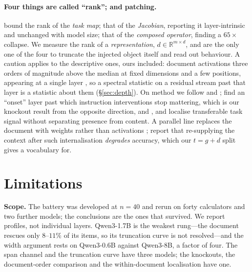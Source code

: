 \documentclass{article}
\newcommand{\dvec}{\ensuremath{d}}
\newcommand{\gvec}{\ensuremath{g}}
\newcommand{\tvec}{\ensuremath{t}}
\begin{document}
\paragraph{Four things are called ``rank''; and patching.}
\citet{dong2026taskvectorlimits} bound the rank of the \emph{task map};
\citet{sarkar2026causaldim} that of the \emph{Jacobian}, reporting it
layer-intrinsic and unchanged with model size;
\citet{fernando2026residualspectral} that of the \emph{composed operator},
finding a $65\times$ collapse. We measure the rank of a \emph{representation},
$\dvec\in\mathbb{R}^{m\times d}$, and are the only one of the four to truncate
the injected object itself and read out behaviour. A caution applies to the
descriptive ones, ours included: \citet{sun2024massive} document activations
three orders of magnitude above the median at fixed dimensions and a few
positions, appearing at a single layer \citep{shi2026melayer}, so a spectral
statistic on a residual stream past that layer is a statistic about them
(\S\ref{sec:depth}). On method we follow \citet{zhang2023bestpractices} and
\citet{heimersheim2024patching}; \citet{onset2025instruction} find an ``onset''
layer past which instruction interventions stop mattering, which is our knockout
result from the opposite direction, and \citet{jit2025taskrepr},
\citet{semanticconflicts2026} and \citet{ragcite2026} localise transferable task
signal without separating presence from content. A parallel line replaces the
document with weights rather than activations \citep{doc2lora2026,
deepcontextdistill2025}; \citet{contextreturns2026} report that re-supplying the
context after such internalisation \emph{degrades} accuracy, which our
$\tvec=\gvec+\dvec$ split gives a vocabulary for.

\section{Limitations}

\textbf{Scope.} The battery was developed at $n=40$ and rerun on forty
calculators and two further models; the conclusions are the ones that survived.
We report profiles, not individual layers. Qwen3-1.7B is the weakest rung---the
document rescues only $8$--$11\%$ of its items, so its truncation curve is not
resolved---and the width argument rests on Qwen3-0.6B against Qwen3-8B, a factor
of four. The span channel and the truncation curve have three models; the
knockouts, the document-order comparison and the within-document localisation
have one.
\end{document}
